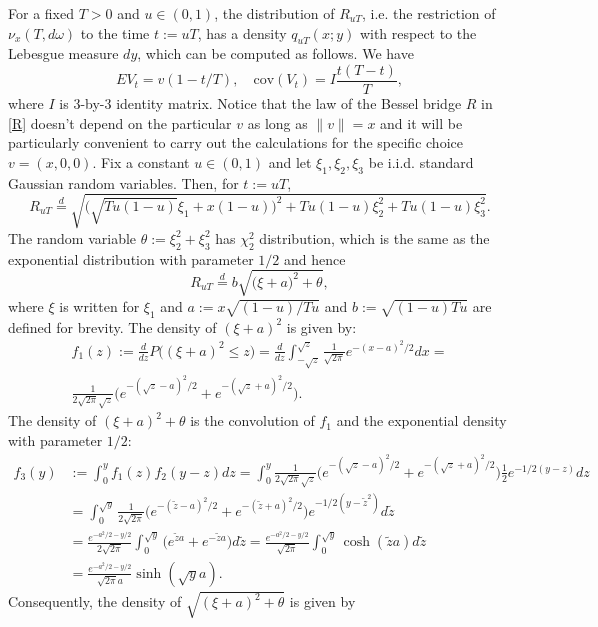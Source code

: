 \documentclass[reqno,10pt]{amsart}
\theoremstyle{definition}
\theoremstyle{remark}
\numberwithin{equation}{section}
\begin{document}
For a fixed $T>0$ and $u\in(0,1)$, the distribution of $R_{uT}$, i.e. the restriction of $\nu_x(T,d\omega)$ to the time $t:=uT$,
has a density $q_{uT}(x;y)$ with respect to the Lebesgue measure $dy$, which can be computed as follows.
We have
$$
E V_t = v(1-t/T), \quad \mathrm{cov}(V_t)=I\frac{t(T-t)}{T},
$$
where $I$ is $3$-by-$3$ identity matrix.
Notice that the law of the Bessel bridge $R$ in \eqref{R} doesn't depend on the particular $v$ as
long as $\|v\|=x$ and
it will be particularly convenient to carry out the calculations
for the specific choice  $v=(x,0,0)$. Fix a constant $u\in(0,1)$  and let $\xi_1,\xi_2,\xi_3$ be i.i.d.
standard Gaussian random variables.
Then, for $t:=uT$,
$$
R_{uT} \stackrel{d}{=} \sqrt{\Big(\sqrt{Tu(1-u)}\xi_1+x(1-u)\Big)^2+
Tu(1-u)\xi_2^2+Tu(1-u)\xi_3^2
}.
$$
The random variable $\theta:=\xi_2^2+\xi_3^2$ has $\chi_2^2$
distribution, which is the same as the exponential distribution with
parameter $1/2$ and hence
\begin{equation}
\label{Rx}
R_{uT} \stackrel{d}{=} b\sqrt{\Big(\xi+a\Big)^2+
\theta
},
\end{equation}
where $\xi$ is written for $\xi_1$ and $a:=x\sqrt{(1-u)/Tu}$ and $b:=\sqrt{(1-u)Tu}$ are defined for brevity.
The density of $(\xi+a)^2$ is given by:
\begin{multline*}
f_1(z):=\frac{d}{dz}P\Big((\xi+a)^2\le z\Big)=\frac{d}{dz}
\int_{-\sqrt{z}}^{\sqrt{z}}\frac 1 {\sqrt{2\pi}} e^{-(x-a)^2/2}dx= \\
\frac 1 {2\sqrt{2\pi}\sqrt{z}} \Big(e^{-(\sqrt{z}-a)^2/2}
+ e^{-(\sqrt{z}+a)^2/2}\Big).
\end{multline*}
The density  of $(\xi+a)^2+\theta$ is the convolution of $f_1$ and the exponential density with parameter $1/2$:
\begin{align*}
f_3(y)&:=\int_0^y f_1(z)f_2(y-z)dz=
\int_0^y \frac 1 {2\sqrt{2\pi}\sqrt{z}} \Big(e^{-(\sqrt{z}-a)^2/2}
+ e^{-(\sqrt{z}+a)^2/2}\Big)\frac 1 2 e^{-1/2 (y-z)}dz\\
&=\int_0^{\sqrt{y}} \frac 1 {2\sqrt{2\pi}} \Big(e^{-(\tilde z-a)^2/2}
+ e^{-(\tilde z+a)^2/2}\Big) e^{-1/2 (y-\tilde z^2)}d\tilde z\\
&=\frac {e^{-a^2/2- y/2}} {2\sqrt{2\pi}}\int_0^{\sqrt{y}}  \Big(e^{\tilde z a }
+ e^{-\tilde z a}\Big) d\tilde z=
\frac {e^{-a^2/2- y/2}} {\sqrt{2\pi}}\int_0^{\sqrt{y}}  \cosh(\tilde za) d\tilde z\\
&=\frac {e^{-a^2/2- y/2}} {\sqrt{2\pi} a}\sinh(\sqrt{y}a).
\end{align*}
Consequently, the density of $\sqrt{(\xi+a)^2+\theta}$ is given by
\end{document}
